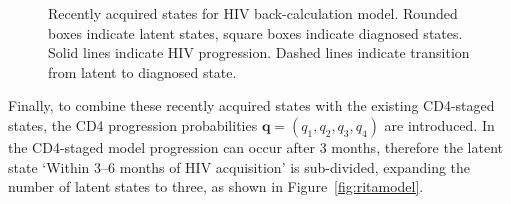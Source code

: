\begin{figure}[htbp!]
  \centering
  \footnotesize
  \caption[Recently acquired states for HIV back-calculation model]{Recently acquired states for HIV back-calculation model. Rounded boxes indicate latent states, square boxes indicate diagnosed states. Solid lines indicate HIV progression. Dashed lines indicate transition from latent to diagnosed state.}\label{fig:rita2latentstates}
\end{figure}

Finally, to combine these recently acquired states with the existing CD4-staged states, the CD4 progression probabilities $\bm{q} = (q_1, q_2, q_3, q_4)$ are introduced. In the CD4-staged model progression can occur after 3 months, therefore the latent state `Within 3--6 months of HIV acquisition' is sub-divided, expanding the number of latent states to three, as shown in Figure~\ref{fig:ritamodel}.

